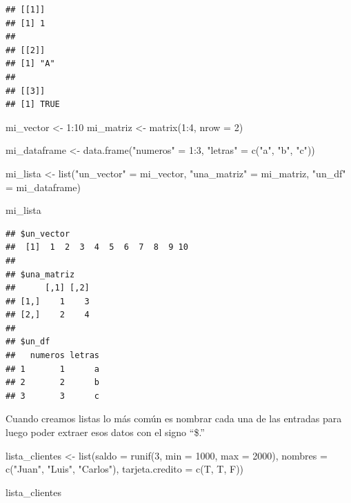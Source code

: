 \documentclass[
  12pt,
]{book}
\newenvironment{Shaded}{\begin{snugshade}}{\end{snugshade}}
\newcommand{\AttributeTok}[1]{\textcolor[rgb]{0.77,0.63,0.00}{#1}}
\newcommand{\DecValTok}[1]{\textcolor[rgb]{0.00,0.00,0.81}{#1}}
\newcommand{\FunctionTok}[1]{\textcolor[rgb]{0.00,0.00,0.00}{#1}}
\newcommand{\NormalTok}[1]{#1}
\newcommand{\OtherTok}[1]{\textcolor[rgb]{0.56,0.35,0.01}{#1}}
\newcommand{\SpecialCharTok}[1]{\textcolor[rgb]{0.00,0.00,0.00}{#1}}
\newcommand{\StringTok}[1]{\textcolor[rgb]{0.31,0.60,0.02}{#1}}
\begin{document}
\begin{verbatim}
## [[1]]
## [1] 1
## 
## [[2]]
## [1] "A"
## 
## [[3]]
## [1] TRUE
\end{verbatim}

\begin{Shaded}
\begin{Highlighting}[]
\NormalTok{mi\_vector }\OtherTok{\textless{}{-}} \DecValTok{1}\SpecialCharTok{:}\DecValTok{10}
\NormalTok{mi\_matriz }\OtherTok{\textless{}{-}} \FunctionTok{matrix}\NormalTok{(}\DecValTok{1}\SpecialCharTok{:}\DecValTok{4}\NormalTok{, }\AttributeTok{nrow =} \DecValTok{2}\NormalTok{)}

\NormalTok{mi\_dataframe }\OtherTok{\textless{}{-}} \FunctionTok{data.frame}\NormalTok{(}\StringTok{"numeros"} \OtherTok{=} \DecValTok{1}\SpecialCharTok{:}\DecValTok{3}\NormalTok{, }\StringTok{"letras"} \OtherTok{=} \FunctionTok{c}\NormalTok{(}\StringTok{"a"}\NormalTok{, }\StringTok{"b"}\NormalTok{, }\StringTok{"c"}\NormalTok{))}

\NormalTok{mi\_lista }\OtherTok{\textless{}{-}} \FunctionTok{list}\NormalTok{(}\StringTok{"un\_vector"} \OtherTok{=}\NormalTok{ mi\_vector, }\StringTok{"una\_matriz"} \OtherTok{=}\NormalTok{ mi\_matriz, }\StringTok{"un\_df"} \OtherTok{=}\NormalTok{ mi\_dataframe)}

\NormalTok{mi\_lista}
\end{Highlighting}
\end{Shaded}

\begin{verbatim}
## $un_vector
##  [1]  1  2  3  4  5  6  7  8  9 10
## 
## $una_matriz
##      [,1] [,2]
## [1,]    1    3
## [2,]    2    4
## 
## $un_df
##   numeros letras
## 1       1      a
## 2       2      b
## 3       3      c
\end{verbatim}

Cuando creamos listas lo más común es nombrar cada una de las entradas para luego poder extraer esos datos con el signo ``\$.''

\begin{Shaded}
\begin{Highlighting}[]
\NormalTok{lista\_clientes }\OtherTok{\textless{}{-}} \FunctionTok{list}\NormalTok{(}\AttributeTok{saldo =} \FunctionTok{runif}\NormalTok{(}\DecValTok{3}\NormalTok{, }\AttributeTok{min =} \DecValTok{1000}\NormalTok{, }\AttributeTok{max =} \DecValTok{2000}\NormalTok{), }\AttributeTok{nombres =} \FunctionTok{c}\NormalTok{(}\StringTok{"Juan"}\NormalTok{, }\StringTok{"Luis"}\NormalTok{, }\StringTok{"Carlos"}\NormalTok{), }\AttributeTok{tarjeta.credito =} \FunctionTok{c}\NormalTok{(T, T, F))}


\NormalTok{lista\_clientes}
\end{Highlighting}
\end{Shaded}
\end{document}
